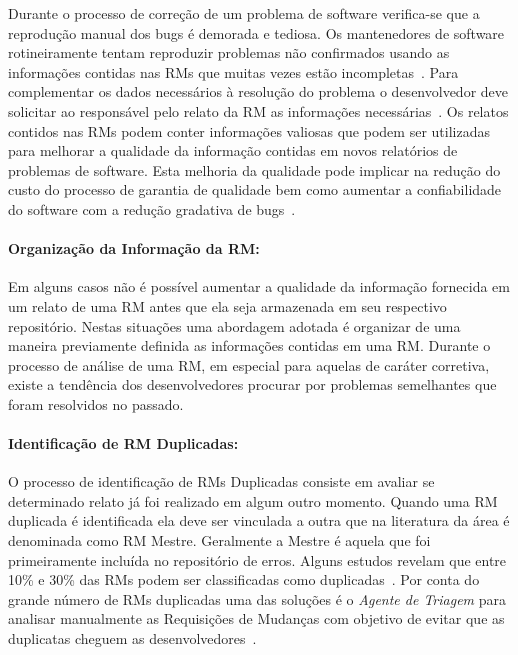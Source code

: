 Durante o processo de correção de um problema de software verifica-se que a
reprodução manual dos bugs é demorada e tediosa. Os mantenedores de software
rotineiramente tentam reproduzir problemas não confirmados usando as informações
contidas nas RMs que muitas vezes estão
incompletas~\cite{White:2015:GRR:2820282.2820291}. Para complementar os dados
necessários à resolução do problema o desenvolvedor deve solicitar ao
responsável pelo relato da RM as informações necessárias~\cite{5070993}. Os
relatos contidos nas RMs podem conter informações valiosas que podem ser
utilizadas para melhorar a qualidade da informação contidas em novos relatórios
de problemas de software. Esta melhoria da qualidade pode implicar na redução do
custo do processo de garantia de qualidade bem como aumentar a confiabilidade do
software com a redução gradativa de bugs~\cite{Tu:2014:MQI:2677832.2677844}.

\paragraph{Organização da Informação da RM:}

Em alguns casos não é possível aumentar a qualidade da informação fornecida em
um relato de uma RM antes que ela seja armazenada em seu respectivo repositório.
Nestas situações uma abordagem adotada é organizar de uma maneira previamente
definida as informações contidas em uma RM\@. Durante o processo de análise de
uma RM, em especial para aquelas de caráter corretiva, existe a tendência dos
desenvolvedores procurar por problemas semelhantes que foram resolvidos no
passado.

\paragraph{Identificação de RM Duplicadas:}

O processo de identificação de RMs Duplicadas consiste em avaliar se determinado
relato já foi realizado em algum outro momento. Quando uma RM duplicada é
identificada ela deve ser vinculada a outra que na literatura da área é
denominada como RM Mestre. Geralmente a Mestre é aquela que foi primeiramente
incluída no repositório de erros. Alguns estudos revelam que entre 10\% e 30\%
das RMs podem ser classificadas como
duplicadas~\cite{anvik2005coping,cavalcanti2013bug,Runeson:2007:DDD:1248820.1248882}.
Por conta do grande número de RMs duplicadas uma das soluções é o \textit{Agente
    de Triagem} para analisar manualmente as Requisições de Mudanças com
objetivo de evitar que as duplicatas cheguem as
desenvolvedores~\cite{anvik2005coping}.

